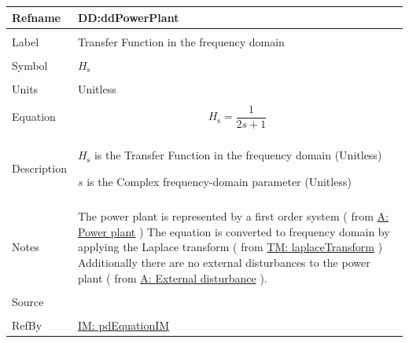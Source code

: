 \documentclass[12pt]{article}
\begin{document}
\vspace{\baselineskip}
\noindent
\begin{minipage}{\textwidth}
\begin{tabular}{>{\raggedright}p{}>{\raggedright\arraybackslash}p{}}
\toprule \textbf{Refname} & \textbf{DD:ddPowerPlant}
\label{DD:ddPowerPlant}
\\ \midrule \\
Label & Transfer Function in the frequency domain
        
\\ \midrule \\
Symbol & ${H_{\text{s}}}$
         
\\ \midrule \\
Units & Unitless
        
\\ \midrule \\
Equation & \begin{displaymath}
           {H_{\text{s}}}=\frac{1}{2 s+1}
           \end{displaymath}
\\ \midrule \\
Description & \begin{symbDescription}
              \item{${H_{\text{s}}}$ is the Transfer Function in the frequency domain (Unitless)}
              \item{$s$ is the Complex frequency-domain parameter (Unitless)}
              \end{symbDescription}
\\ \midrule \\
Notes & The power plant is represented by a first order system ( from  \hyperref[pwrPlant]{A: Power plant} ) The equation is converted to frequency domain by applying the Laplace transform ( from \hyperref[TM:laplaceTransform]{TM: laplaceTransform} ) Additionally there are no external disturbances to the power plant ( from  \hyperref[externalDistub]{A: External disturbance} ).
        
\\ \midrule \\
Source & \cite{pidWiki}
         
\\ \midrule \\
RefBy & \hyperref[IM:pdEquationIM]{IM: pdEquationIM}
        
\\ \bottomrule
\end{tabular}
\end{minipage}
\end{document}
